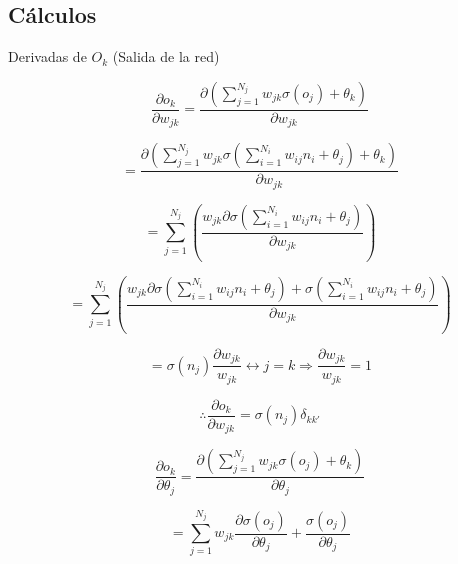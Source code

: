 \subsection{C\'alculos}
Derivadas de $O_k$ (Salida de la red)

\begin{equation*}
	\frac{\partial o_k}{\partial w_{jk}} = \frac{ \partial \left( \sum \limits_{j=1} ^ {N_j} w_{jk} \sigma (o_j) + \theta _k \right) }{ \partial w_{jk} }
\end{equation*}

\begin{equation*}
	=\frac{ \partial \left( \sum \limits_{j=1} ^ {N_j} w_{jk} \sigma \left( \sum\limits_{i=1}^{N_i} w_{ij}n_i+\theta _j \right) + \theta _k \right) }{ \partial w_{jk} }
\end{equation*}

\begin{equation*}
	=\sum\limits_{j=1}^{N_j} \left( \frac{ w_{jk}\partial \sigma \left( \sum\limits_{i=1}^{N_i} w_{ij}n_i+\theta _j \right) }{ \partial w_{jk} } \right)
\end{equation*}

\begin{equation*}
	=\sum\limits_{j=1}^{N_j} \left( \frac{ w_{jk}\partial \sigma \left( \sum\limits_{i=1}^{N_i} w_{ij}n_i+\theta _j \right) +\sigma \left( \sum\limits_{i=1}^{N_i} w_{ij}n_i+\theta _j \right) }{ \partial w_{jk} } \right)
\end{equation*}

\begin{equation*}
	= \sigma \left( n_j \right) \frac{\partial w_{jk}}{w_{jk}} \longleftrightarrow j=k \Rightarrow \frac{\partial w_{jk}}{w_{jk}}=1
\end{equation*}

\begin{equation}
	\therefore \frac{\partial o_k}{\partial w_{jk}} = \sigma \left( n_j \right) \delta_{k k'}
\end{equation}


\begin{equation*}
	\frac{\partial o_k}{\partial \theta_j} = \frac{ \partial \left( \sum \limits_{j=1} ^ {N_j} w_{jk} \sigma (o_j) + \theta _k \right) }{ \partial \theta_j }
\end{equation*}

\begin{equation*}
	=\sum\limits_{j=1}^{N_j} w_{jk} \frac{\partial \sigma \left( o_j \right)}{\partial \theta_j} + \frac{\sigma \left( o_j \right)}{\partial \theta_j}
\end{equation*}

